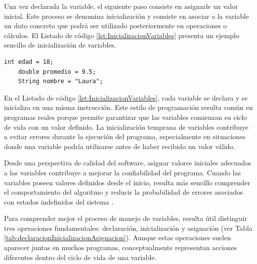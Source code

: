 \documentclass[12pt,twoside]{book}
\begin{document}
					Una vez declarada la variable, el siguiente paso consiste en asignarle un valor inicial. Este proceso se denomina inicialización y consiste en asociar a la variable un dato concreto que podrá ser utilizado posteriormente en operaciones o cálculos. El Listado de código \ref{lst:InicializacionVariables} presenta un ejemplo sencillo de inicialización de variables.
					
					\begin{lstlisting}[style=Java,caption={Inicialización de variables en Java.},label={lst:InicializacionVariables}]
	int edad = 18;
	double promedio = 9.5;
	String nombre = "Laura";
					\end{lstlisting}
					
					\noindent
					En el Listado de código \ref{lst:InicializacionVariables}, cada variable se declara y se inicializa en una misma instrucción. Este estilo de programación resulta común en programas reales porque permite garantizar que las variables comienzan su ciclo de vida con un valor definido. La inicialización temprana de variables contribuye a evitar errores durante la ejecución del programa, especialmente en situaciones donde una variable podría utilizarse antes de haber recibido un valor válido.
					
					Desde una perspectiva de calidad del software, asignar valores iniciales adecuados a las variables contribuye a mejorar la confiabilidad del programa. Cuando las variables poseen valores definidos desde el inicio, resulta más sencillo comprender el comportamiento del algoritmo y reducir la probabilidad de errores asociados con estados indefinidos del sistema \cite{Pressman2019Software,Sommerville2015Software}.
					
					Para comprender mejor el proceso de manejo de variables, resulta útil distinguir tres operaciones fundamentales: declaración, inicialización y asignación (ver Tabla \ref{tab:declaracionInicializacionAsignacion}). Aunque estas operaciones suelen aparecer juntas en muchos programas, conceptualmente representan acciones diferentes dentro del ciclo de vida de una variable.
					
\end{document}

